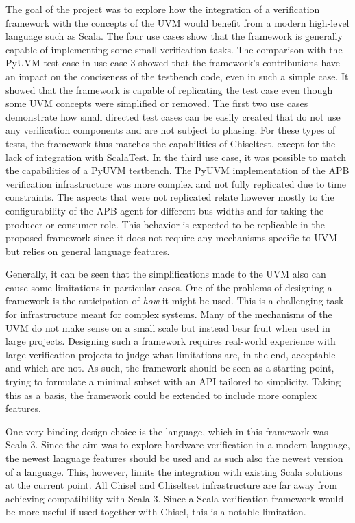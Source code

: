 The goal of the project was to explore how the integration of a verification framework with the concepts of the UVM would benefit from a modern high-level language such as Scala. The four use cases show that the framework is generally capable of implementing some small verification tasks. The comparison with the PyUVM test case in use case 3 showed that the framework's contributions have an impact on the conciseness of the testbench code, even in such a simple case. It showed that the framework is capable of replicating the test case even though some UVM concepts were simplified or removed. The first two use cases demonstrate how small directed test cases can be easily created that do not use any verification components and are not subject to phasing. For these types of tests, the framework thus matches the capabilities of Chiseltest, except for the lack of integration with ScalaTest. In the third use case, it was possible to match the capabilities of a PyUVM testbench. The PyUVM implementation of the APB verification infrastructure was more complex and not fully replicated due to time constraints. The aspects that were not replicated relate however mostly to the configurability of the APB agent for different bus widths and for taking the producer or consumer role. This behavior is expected to be replicable in the proposed framework since it does not require any mechanisms specific to UVM but relies on general language features.

Generally, it can be seen that the simplifications made to the UVM also can cause some limitations in particular cases. One of the problems of designing a framework is the anticipation of \textit{how} it might be used. This is a challenging task for infrastructure meant for complex systems. Many of the mechanisms of the UVM do not make sense on a small scale but instead bear fruit when used in large projects. Designing such a framework requires real-world experience with large verification projects to judge what limitations are, in the end, acceptable and which are not. As such, the framework should be seen as a starting point, trying to formulate a minimal subset with an API tailored to simplicity. Taking this as a basis, the framework could be extended to include more complex features.

One very binding design choice is the language, which in this framework was Scala 3. Since the aim was to explore hardware verification in a modern language, the newest language features should be used and as such also the newest version of a language. This, however, limits the integration with existing Scala solutions at the current point. All Chisel and Chiseltest infrastructure are far away from achieving compatibility with Scala 3. Since a Scala verification framework would be more useful if used together with Chisel, this is a notable limitation.

